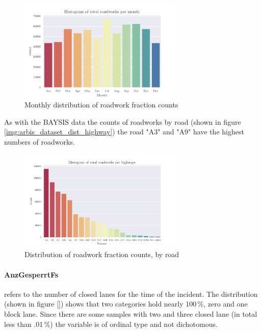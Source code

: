 \begin{figure}[ht]
	\centering
	\includegraphics[width=0.7\textwidth]{../CorrAnalysis/data/ArbIS/01_dataset/plots/arbis_dataset_hist_month}
	\caption{Monthly distribution of roadwork fraction counts}
	\label{img:arbis_dataset_dist_month}
\end{figure}

As with the BAYSIS data the counts of roadworks by road (shown in figure \autoref{img:arbis_dataset_dist_highway}) the road "A3" and "A9" have the highest numbers of roadworks.

\begin{figure}[ht]
	\centering
	\includegraphics[width=0.7\textwidth]{../CorrAnalysis/data/ArbIS/01_dataset/plots/arbis_dataset_hist_highway}
	\caption{Distribution of roadwork fraction counts, by road}
	\label{img:arbis_dataset_dist_highway}
\end{figure}

\paragraph{AnzGesperrtFs} refers to the number of closed lanes for the time of the incident. The distribution (shown in figure \autoref{}) shows that two categories hold nearly 100\,\%, zero and one block lane. Since there are some samples with two and three closed lane (in total less than .01\,\%) the variable is of ordinal type and not dichotomous.

